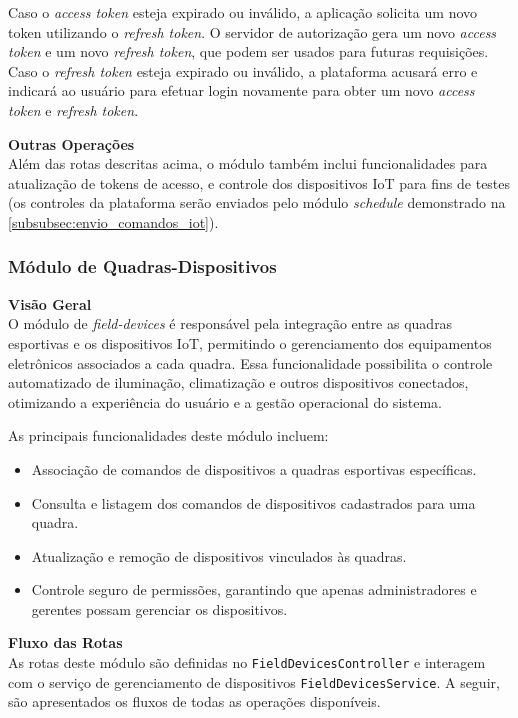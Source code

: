Caso o \textit{access token} esteja expirado ou inválido, a aplicação solicita um novo token utilizando o \textit{refresh token}. O servidor de autorização gera um novo \textit{access token} e um novo \textit{refresh token}, que podem ser usados para futuras requisições. Caso o \textit{refresh token} esteja expirado ou inválido, a plataforma acusará erro e indicará ao usuário para efetuar login novamente para obter um novo \textit{access token} e \textit{refresh token}.
 
\noindent\textbf{Outras Operações}\\
Além das rotas descritas acima, o módulo também inclui funcionalidades para atualização de tokens de acesso, e controle dos dispositivos IoT para fins de testes (os controles da plataforma serão enviados pelo módulo \textit{schedule} demonstrado na \autoref{subsubsec:envio_comandos_iot}).

\subsubsection{Módulo de Quadras-Dispositivos}\label{subsubsec:modulo_quadras_dispositivos}

\noindent\textbf{Visão Geral}\\
O módulo de \textit{field-devices} é responsável pela integração entre as quadras esportivas e os dispositivos IoT, permitindo o gerenciamento dos equipamentos eletrônicos associados a cada quadra. Essa funcionalidade possibilita o controle automatizado de iluminação, climatização e outros dispositivos conectados, otimizando a experiência do usuário e a gestão operacional do sistema.

As principais funcionalidades deste módulo incluem:

\begin{itemize}
\item Associação de comandos de dispositivos a quadras esportivas específicas.
\item Consulta e listagem dos comandos de dispositivos cadastrados para uma quadra.
\item Atualização e remoção de dispositivos vinculados às quadras.
\item Controle seguro de permissões, garantindo que apenas administradores e gerentes possam gerenciar os dispositivos.
\end{itemize}

\noindent\textbf{Fluxo das Rotas}\\
As rotas deste módulo são definidas no \texttt{FieldDevicesController} e interagem com o serviço de gerenciamento de dispositivos \texttt{FieldDevicesService}. A seguir, são apresentados os fluxos de todas as operações disponíveis.

